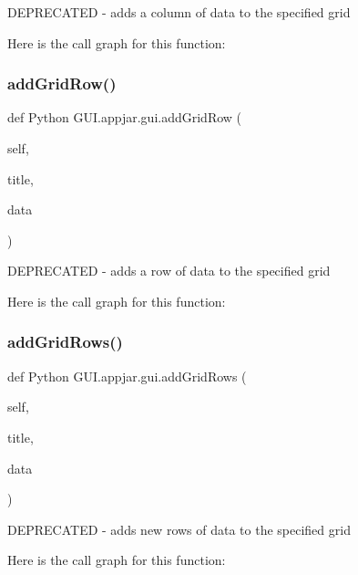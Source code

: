 \begin{DoxyVerb}DEPRECATED - adds a column of data to the specified grid \end{DoxyVerb}
 Here is the call graph for this function\+:
\mbox{\label{class_python_01_g_u_i_1_1appjar_1_1gui_a441374ce26eb6c2efb743a75a39ea3c4}} 
\subsubsection{\texorpdfstring{add\+Grid\+Row()}{addGridRow()}}
{\footnotesize\ttfamily def Python G\+U\+I.\+appjar.\+gui.\+add\+Grid\+Row (\begin{DoxyParamCaption}\item[{}]{self,  }\item[{}]{title,  }\item[{}]{data }\end{DoxyParamCaption})}

\begin{DoxyVerb}DEPRECATED - adds a row of data to the specified grid \end{DoxyVerb}
 Here is the call graph for this function\+:
\mbox{\label{class_python_01_g_u_i_1_1appjar_1_1gui_ab5dd21fc5cee948f8107f77cc712d3c8}} 
\subsubsection{\texorpdfstring{add\+Grid\+Rows()}{addGridRows()}}
{\footnotesize\ttfamily def Python G\+U\+I.\+appjar.\+gui.\+add\+Grid\+Rows (\begin{DoxyParamCaption}\item[{}]{self,  }\item[{}]{title,  }\item[{}]{data }\end{DoxyParamCaption})}

\begin{DoxyVerb}DEPRECATED - adds new rows of data to the specified grid \end{DoxyVerb}
 Here is the call graph for this function\+:
\mbox{\label{class_python_01_g_u_i_1_1appjar_1_1gui_a48bcb77cc267e96ec065712e593b6449}} 
